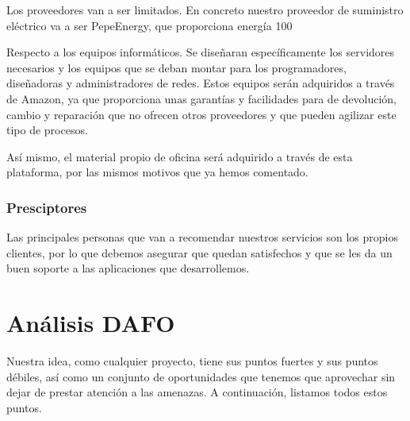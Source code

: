 Los proveedores van a ser limitados. En concreto nuestro proveedor de suministro eléctrico va a ser PepeEnergy, que proporciona energía 100%

Respecto a los equipos informáticos. Se diseñaran específicamente los servidores necesarios y los equipos que se deban montar para los programadores, diseñadoras y administradores de redes. Estos equipos serán adquiridos a través de Amazon, ya que proporciona unas garantías y facilidades para de devolución, cambio y reparación que no ofrecen otros proveedores y que pueden agilizar este tipo de procesos.

Así mismo, el material propio de oficina será adquirido a través de esta plataforma, por las mismos motivos que ya hemos comentado.

\subsubsection{Presciptores}
Las principales personas que van a recomendar nuestros servicios son los propios clientes, por lo que debemos asegurar que quedan satisfechos y que se les da un buen soporte a las aplicaciones que desarrollemos.

\section{Análisis DAFO}
Nuestra idea, como cualquier proyecto, tiene sus puntos fuertes y sus puntos débiles, así como un conjunto de oportunidades que tenemos que aprovechar sin dejar de prestar atención a las amenazas. A continuación, listamos todos estos puntos.

